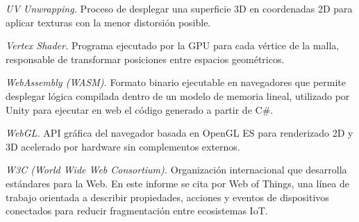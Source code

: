 \textit{UV Unwrapping.} Proceso de desplegar una superficie 3D en coordenadas 2D para aplicar texturas con la menor distorsión posible.

\textit{Vertex Shader.} Programa ejecutado por la GPU para cada vértice de la malla, responsable de transformar posiciones entre espacios geométricos.

\textit{WebAssembly (WASM).} Formato binario ejecutable en navegadores que permite desplegar lógica compilada dentro de un modelo de memoria lineal, utilizado por Unity para ejecutar en web el código generado a partir de C\#.

\textit{WebGL.} API gráfica del navegador basada en OpenGL ES para renderizado 2D y 3D acelerado por hardware sin complementos externos.

\textit{W3C (\textit{World Wide Web Consortium}).} Organización internacional que desarrolla estándares para la Web. En este informe se cita por Web of Things, una línea de trabajo orientada a describir propiedades, acciones y eventos de dispositivos conectados para reducir fragmentación entre ecosistemas IoT.

\newpage
